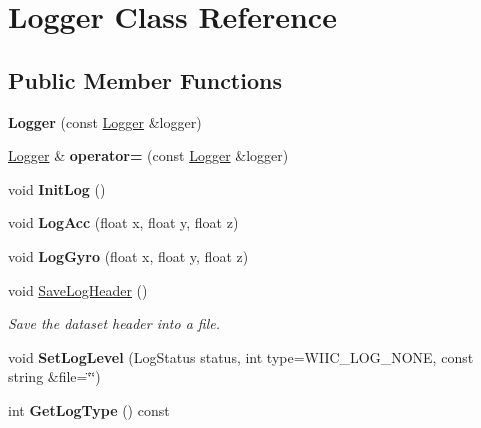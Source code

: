 \hypertarget{class_logger}{\section{Logger Class Reference}
\label{class_logger}
}
\subsection*{Public Member Functions}
\begin{DoxyCompactItemize}
\item 
\hypertarget{class_logger_a2c5d5039e76ef20903ce7cfbc8030d47}{{\bfseries Logger} (const \hyperlink{class_logger}{Logger} \&logger)}\label{class_logger_a2c5d5039e76ef20903ce7cfbc8030d47}

\item 
\hypertarget{class_logger_a400dd030dcec25d075f87202e880c5b9}{\hyperlink{class_logger}{Logger} \& {\bfseries operator=} (const \hyperlink{class_logger}{Logger} \&logger)}\label{class_logger_a400dd030dcec25d075f87202e880c5b9}

\item 
\hypertarget{class_logger_ab0e0c798082dce3c3f805a3b92baef10}{void {\bfseries Init\-Log} ()}\label{class_logger_ab0e0c798082dce3c3f805a3b92baef10}

\item 
\hypertarget{class_logger_a7085c6904ef225d6d3475c803c553570}{void {\bfseries Log\-Acc} (float x, float y, float z)}\label{class_logger_a7085c6904ef225d6d3475c803c553570}

\item 
\hypertarget{class_logger_ac667db7ddb53dff68e409858fdca1faa}{void {\bfseries Log\-Gyro} (float x, float y, float z)}\label{class_logger_ac667db7ddb53dff68e409858fdca1faa}

\item 
void \hyperlink{class_logger_a221bdfa77db049b43ee048d0c17abcce}{Save\-Log\-Header} ()
\begin{DoxyCompactList}\small\item\em Save the dataset header into a file. \end{DoxyCompactList}\item 
\hypertarget{class_logger_a45f7ca2bd55bfc1867f97b3e96c234d6}{void {\bfseries Set\-Log\-Level} (Log\-Status status, int type=W\-I\-I\-C\-\_\-\-L\-O\-G\-\_\-\-N\-O\-N\-E, const string \&file=\char`\"{}\char`\"{})}\label{class_logger_a45f7ca2bd55bfc1867f97b3e96c234d6}

\item 
\hypertarget{class_logger_aca399821afdcdc5913b56c7a1180399f}{int {\bfseries Get\-Log\-Type} () const }\label{class_logger_aca399821afdcdc5913b56c7a1180399f}


\end{DoxyCompactItemize}
